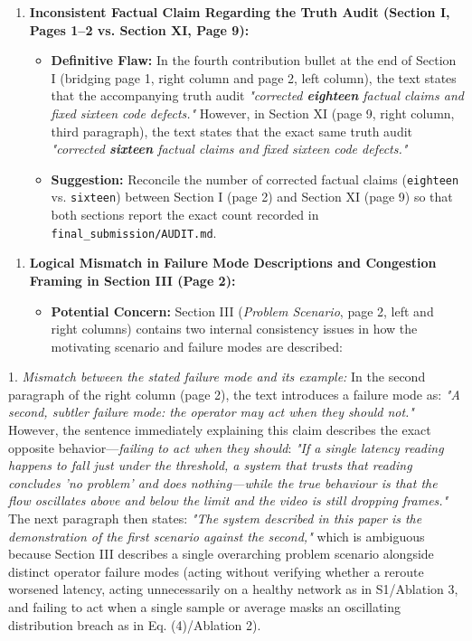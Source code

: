 \documentclass[11pt,a4paper]{article}
\begin{document}
\begin{enumerate}[leftmargin=1.6em,itemsep=3pt]
\item \textbf{Inconsistent Factual Claim Regarding the Truth Audit (Section I, Pages 1–2 vs. Section XI, Page 9):}
\begin{itemize}[leftmargin=1.8em,itemsep=2pt]
\item \textbf{Definitive Flaw:} In the fourth contribution bullet at the end of Section I (bridging page 1, right column and page 2, left column), the text states that the accompanying truth audit \emph{"corrected \textbf{eighteen} factual claims and fixed sixteen code defects."} However, in Section XI (page 9, right column, third paragraph), the text states that the exact same truth audit \emph{"corrected \textbf{sixteen} factual claims and fixed sixteen code defects."}
\item \textbf{Suggestion:} Reconcile the number of corrected factual claims (\texttt{eighteen} vs. \texttt{sixteen}) between Section I (page 2) and Section XI (page 9) so that both sections report the exact count recorded in \texttt{final\_submission/AUDIT.md}.
\end{itemize}
\end{enumerate}
\begin{enumerate}[leftmargin=1.6em,itemsep=3pt]
\item \textbf{Logical Mismatch in Failure Mode Descriptions and Congestion Framing in Section III (Page 2):}
\begin{itemize}[leftmargin=1.8em,itemsep=2pt]
\item \textbf{Potential Concern:} Section III (\emph{Problem Scenario}, page 2, left and right columns) contains two internal consistency issues in how the motivating scenario and failure modes are described:
\end{itemize}
\end{enumerate}
1. \emph{Mismatch between the stated failure mode and its example:} In the second paragraph of the right column (page 2), the text introduces a failure mode as: \emph{"A second, subtler failure mode: the operator may act when they should not."} However, the sentence immediately explaining this claim describes the exact opposite behavior—\emph{failing to act when they should}: \emph{"If a single latency reading happens to fall just under the threshold, a system that trusts that reading concludes 'no problem' and does nothing—while the true behaviour is that the flow oscillates above and below the limit and the video is still dropping frames."} The next paragraph then states: \emph{"The system described in this paper is the demonstration of the first scenario against the second,"} which is ambiguous because Section III describes a single overarching problem scenario alongside distinct operator failure modes (acting without verifying whether a reroute worsened latency, acting unnecessarily on a healthy network as in S1/Ablation 3, and failing to act when a single sample or average masks an oscillating distribution breach as in Eq. (4)/Ablation 2).
\end{document}
